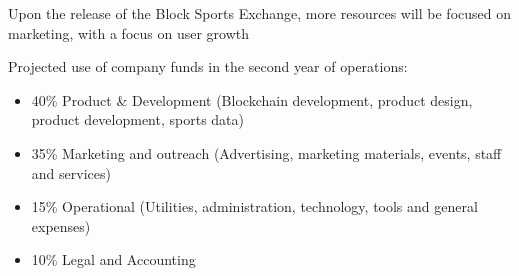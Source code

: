 \documentclass{article}
\begin{document}
Upon the release of the Block Sports Exchange, more resources will be focused on marketing, with a focus on user growth

Projected use of company funds in the second year of operations:

\begin{itemize}
	\item 40\% Product \& Development (Blockchain development, product design, product development, sports data)
	\item 35\% Marketing and outreach (Advertising, marketing materials, events, staff and services)
	\item 15\% Operational (Utilities, administration, technology, tools and general expenses)
	\item 10\% Legal and Accounting
\end{itemize}
\end{document}
